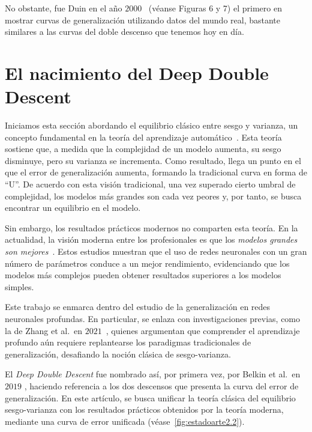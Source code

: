 No obstante, fue Duin en el año $2000$~\cite{Duin2000} (véanse Figuras 6 y 7) el primero en mostrar curvas de generalización utilizando datos del mundo real, bastante similares a las curvas del doble descenso que tenemos hoy en día.\newline

\section{El nacimiento del Deep Double Descent}\label{}

Iniciamos esta sección abordando el equilibrio clásico entre sesgo y varianza, un concepto fundamental en la teoría del aprendizaje automático~\cite{Geman1992, Hastie2001, Bengio2010}. Esta teoría sostiene que, a medida que la complejidad de un modelo aumenta, su sesgo disminuye, pero su varianza se incrementa. Como resultado, llega un punto en el que el error de generalización aumenta, formando la tradicional curva en forma de ``U''. De acuerdo con esta visión tradicional, una vez superado cierto umbral de complejidad, los modelos más grandes son cada vez peores y, por tanto, se busca encontrar un equilibrio en el modelo.\newline

Sin embargo, los resultados prácticos modernos no comparten esta teoría. En la actualidad, la visión moderna entre los profesionales es que los \emph{modelos grandes son mejores}~\cite{Krizhevsky2012, Neal2019, Huang2019, Szegedy2014}. Estos estudios muestran que el uso de redes neuronales con un gran número de parámetros conduce a un mejor rendimiento, evidenciando que los modelos más complejos pueden obtener resultados superiores a los modelos simples.\newline

Este trabajo se enmarca dentro del estudio de la generalización en redes neuronales profundas. En particular, se enlaza con investigaciones previas, como la de Zhang et al.\ en $2021$~\cite{Zhang2021}, quienes argumentan que comprender el aprendizaje profundo aún requiere replantearse los paradigmas tradicionales de generalización, desafiando la noción clásica de sesgo-varianza.\newline

El \emph{Deep Double Descent} fue nombrado así, por primera vez, por Belkin et al.\ en $2019$ \cite{Belkin2019}, haciendo referencia a los dos descensos que presenta la curva del error de generalización. En este artículo, se busca unificar la teoría clásica del equilibrio sesgo-varianza con los resultados prácticos obtenidos por la teoría moderna, mediante una curva de error unificada (véase~\autoref{fig:estadoarte2.2}).\newline

